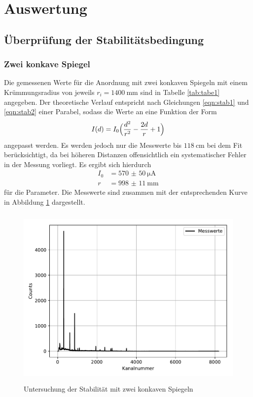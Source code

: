 \section{Auswertung}
\label{sec:Auswertung}


\subsection{Überprüfung der Stabilitätsbedingung}

\subsubsection{Zwei konkave Spiegel}
Die gemessenen Werte für die Anordnung mit zwei konkaven Spiegeln mit einem
Krümmungsradius von jeweils $r_i = \SI{1400}{\milli\meter}$ sind in Tabelle \ref{tab:tabe1}
angegeben. Der theoretische Verlauf entspricht nach Gleichungen \ref{eqn:stab1}
und \ref{eqn:stab2} einer Parabel,
sodass die Werte an eine Funktion der Form
\begin{equation}
  I(d)= I_0\Bigl(\frac{d^2}{r^2}-\frac{2d}{r}+1\Bigr)
\end{equation}
angepasst werden. Es werden jedoch nur die Messwerte bis $\SI{118}{\centi\meter}$
bei dem Fit berücksichtigt, da bei höheren Distanzen offensichtlich ein systematischer
Fehler in der Messung vorliegt.
Es ergibt sich hierdurch
\begin{align*}
  I_0 &= \SI{570(50)}{\micro\ampere} \\
  r &=\SI{998(11)}{\milli\meter}
\end{align*}
für die Parameter. Die Messwerte sind zusammen mit der
entsprechenden Kurve in Abbildung \ref{fig:plot1} dargestellt.
\begin{figure}
  \centering
  \includegraphics[height=9cm]{Plot1.pdf}
  \caption{Untersuchung der Stabilität mit zwei konkaven Spiegeln}
  \label{fig:plot1}
\end{figure}

